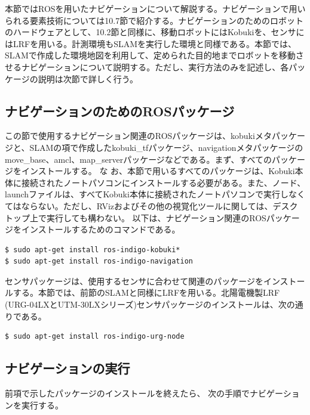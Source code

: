 本節ではROSを用いたナビゲーションについて解説する。ナビゲーションで用いられる要素技術については10.7節で紹介する。ナビゲーションのためのロボットのハードウェアとして、10.2節と同様に、移動ロボットにはKobukiを、センサにはLRFを用いる。計測環境もSLAMを実行した環境と同様である。本節では、SLAMで作成した環境地図を利用して、定められた目的地までロボットを移動させるナビゲーションについて説明する。ただし、実行方法のみを記述し、各パッケージの説明は次節で詳しく行う。

\subsection{ナビゲーションのためのROSパッケージ}

この節で使用するナビゲーション関連のROSパッケージは、kobukiメタパッケージと、SLAMの項で作成したkobuki\_tfパッケージ、navigationメタパッケージのmove\_base、amcl、map\_serverパッケージなどである。まず、すべてのパッケージをインストールする。 な お、本節で用いるすべてのパッケージは、Kobuki本体に接続されたノートパソコンにインストールする必要がある。また、ノード、launchファイルは、すべてKobuki本体に接続されたノートパソコンで実行しなくてはならない。ただし、RVizおよびその他の視覚化ツールに関しては、デスクトップ上で実行しても構わない。
以下は、ナビゲーション関連のROSパッケージをインストールするためのコマンドである。

\begin{lstlisting}[language=ROS]
$ sudo apt-get install ros-indigo-kobuki*
$ sudo apt-get install ros-indigo-navigation
\end{lstlisting}

センサパッケージは、使用するセンサに合わせて関連のパッケージをインストールする。本節では、前節のSLAMと同様にLRFを用いる。北陽電機製LRF (URG-04LXとUTM-30LXシリーズ)センサパッケージのインストールは、次の通りである。

\begin{lstlisting}[language=ROS]
$ sudo apt-get install ros-indigo-urg-node
\end{lstlisting}

\subsection{ナビゲーションの実行}

前項で示したパッケージのインストールを終えたら、  次の手順でナビゲーションを実行する。

